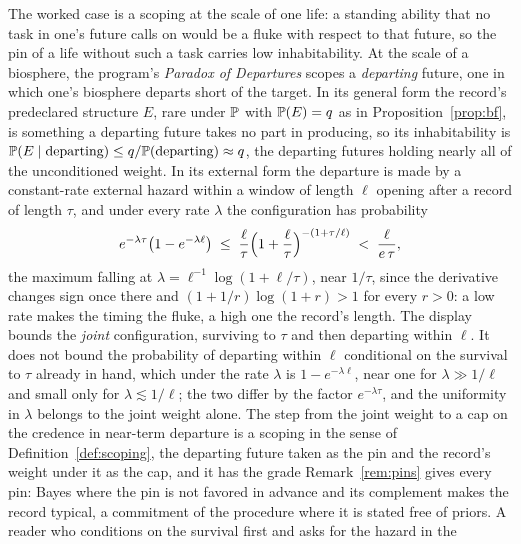\begin{remark}\label{rem:scopings}
The worked case is a scoping at the scale of one life: a
standing ability that no task in one's future calls on would be a fluke
with respect to that future, so the pin of a life without such a task
carries low inhabitability. At the scale of a biosphere, the program's
\emph{Paradox of Departures} scopes a \emph{departing} future, one in
which one's biosphere departs short of the target. In its general form
the record's predeclared structure $E$, rare under $\mathbb{P}$ with
$\mathbb{P}(E)=q$ as in Proposition~\ref{prop:bf}, is something a departing
future takes no part in producing, so its inhabitability is
$\mathbb{P}(E\mid\text{departing})\le q/\mathbb{P}(\text{departing})\approx q$, the
departing futures holding nearly all of the unconditioned weight. In its
external form the departure is made by a constant-rate external hazard
within a window of length $\ell$ opening after a record of length
$\tau$, and under every rate $\lambda$ the configuration has probability
\[
e^{-\lambda\tau}\bigl(1-e^{-\lambda\ell}\bigr)\;\le\;
\frac{\ell}{\tau}\Bigl(1+\frac{\ell}{\tau}\Bigr)^{-(1+\tau/\ell)}
\;<\;\frac{\ell}{e\,\tau},
\]
the maximum falling at $\lambda=\ell^{-1}\log(1+\ell/\tau)$, near
$1/\tau$, since the derivative changes sign once there and
$(1+1/r)\log(1+r)>1$ for every $r>0$: a low rate makes the timing the
fluke, a high one the record's length. The display bounds the
\emph{joint} configuration, surviving to $\tau$ and then departing
within $\ell$. It does not bound the probability of departing within
$\ell$ conditional on the survival to $\tau$ already in hand, which
under the rate $\lambda$ is $1-e^{-\lambda\ell}$, near one for
$\lambda\gg1/\ell$ and small only for $\lambda\lesssim1/\ell$; the two
differ by the factor $e^{-\lambda\tau}$, and the uniformity in
$\lambda$ belongs to the joint weight alone. The step from the joint
weight to a cap on the credence in near-term departure is a scoping in
the sense of Definition~\ref{def:scoping}, the departing future taken
as the pin and the record's weight under it as the cap, and it has the
grade Remark~\ref{rem:pins} gives every pin: Bayes where the pin is not
favored in advance and its complement makes the record typical, a
commitment of the procedure where it is stated free of priors. A reader
who conditions on the survival first and asks for the hazard in the

\end{remark}
